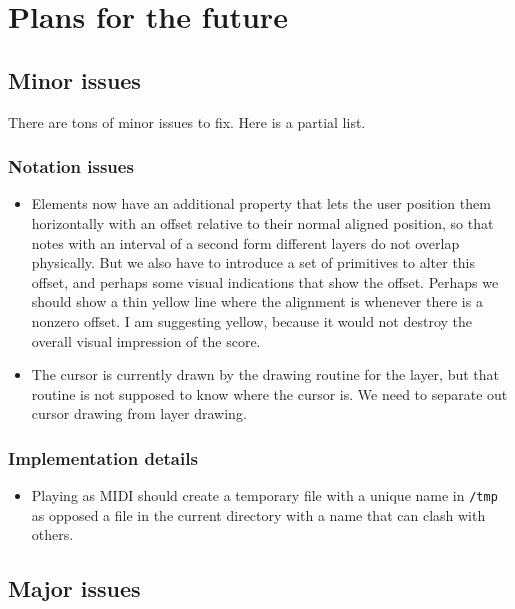 \chapter{Plans for the future}

\section{Minor issues}

There are tons of minor issues to fix.  Here is a partial list.

\subsection{Notation issues}

\begin{itemize}
\item Elements now have an additional property that lets the user
  position them horizontally with an offset relative to their normal
  aligned position, so that notes with an interval of a second form
  different layers do not overlap physically.  But we also have to
  introduce a set of primitives to alter this offset, and perhaps some
  visual indications that show the offset.  Perhaps we should show a
  thin yellow line where the alignment is whenever there is a nonzero
  offset.  I am suggesting yellow, because it would not destroy the
  overall visual impression of the score. 
\item The cursor is currently drawn by the drawing routine for the
  layer, but that routine is not supposed to know where the cursor
  is.  We need to separate out cursor drawing from layer drawing. 
\end{itemize}

\subsection{Implementation details}

\begin{itemize}
\item Playing as MIDI should create a temporary file with a unique
  name in \texttt{/tmp} as opposed a file in the current directory
  with a name that can clash with others. 
\end{itemize}

\section{Major issues}

